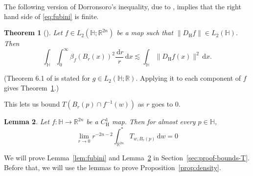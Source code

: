 \documentclass[12pt,reqno]{amsart}
\newcommand{\HH}{\mathbb{H}}
\newcommand{\R}{\mathbb{R}}
\newcommand{\ud}[0]{\,\mathrm{d}}
\newcommand{\from}{\colon}
\newtheorem{thm}{Theorem}[section]
\newtheorem{lemma}[thm]{Lemma}
\theoremstyle{remark}
\newcommand{\0}{\mathbf{0}}
\renewcommand{\1}{\mathbf 1}
\begin{document}
The following version of Dorronsoro's inequality, due to \cite{FO-Dorronsoro}, implies that the right hand side of \eqref{eq:fubini} is finite.  
\begin{thm}[{\cite[Theorem 6.1]{FO-Dorronsoro}}]\label{thm:dorronsoro}
    Let $f\in L_2(\HH;\mathbb R^{2n})$ be a map such that $\|D_{\mathrm H}f\|\in L_2(\HH)$.
    Then 
    \[
    \int_{\HH} \int_0^\infty \beta_f(B_r(x))^2\frac{\ud r}{r}\ud x \lesssim \int_{\HH} \|D_{\mathrm H}f(x)\|^2\ud x.
    \]
\end{thm}
(Theorem 6.1 of \cite{FO-Dorronsoro} is stated for $g\in L_2(\HH;\R)$. Applying it to each component of $f$ gives Theorem~\ref{thm:dorronsoro}.)



This lets us bound $T(B_r(p) \cap f^{-1}(w))$ as $r$ goes to $0$.
\begin{lemma}\label{lem:error-density}
  Let $f\from \HH \to \R^{2n}$ be a $C^1_{\mathrm{H}}$ map. Then for almost every $p\in \HH$, 
  \begin{equation}\label{eq:error-density}
    \lim_{r\to 0} r^{-2n-2}\int^*_{\R^{2n}} T_{w,B_r(p)} \ud w = 0
  \end{equation}
\end{lemma}
We will prove Lemma~\ref{lem:fubini} and Lemma~\ref{lem:error-density} in Section~\ref{sec:proof-bounds-T}. Before that, we will use the lemmas to prove Proposition~\ref{prop:density}.
\end{document}
